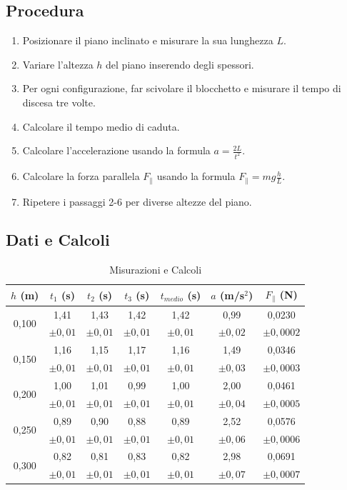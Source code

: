 \subsection{Procedura}
\begin{enumerate}
    \item Posizionare il piano inclinato e misurare la sua lunghezza $L$.
    \item Variare l'altezza $h$ del piano inserendo degli spessori.
    \item Per ogni configurazione, far scivolare il blocchetto e misurare il tempo di discesa tre volte.
    \item Calcolare il tempo medio di caduta.
    \item Calcolare l'accelerazione usando la formula $a = \frac{2L}{t^2}$.
    \item Calcolare la forza parallela $F_\parallel$ usando la formula $F_\parallel = m g \frac{h}{L}$.
    \item Ripetere i passaggi 2-6 per diverse altezze del piano.
\end{enumerate}

\subsection{Dati e Calcoli}

\begin{table}[h]
\centering
\caption{Misurazioni e Calcoli}
\begin{tabular}{ccccccc}
\toprule
$h$ (m) & $t_1$ (s) & $t_2$ (s) & $t_3$ (s) & $t_{medio}$ (s) & $a$ (m/s$^2$) & $F_\parallel$ (N) \\
\midrule
\multirow{2}{*}{0,100} & 1,41 & 1,43 & 1,42 & 1,42 & 0,99 & 0,0230 \\
& $\pm 0,01$ & $\pm 0,01$ & $\pm 0,01$ & $\pm 0,01$ & $\pm 0,02$ & $\pm 0,0002$ \\
\midrule
\multirow{2}{*}{0,150} & 1,16 & 1,15 & 1,17 & 1,16 & 1,49 & 0,0346 \\
& $\pm 0,01$ & $\pm 0,01$ & $\pm 0,01$ & $\pm 0,01$ & $\pm 0,03$ & $\pm 0,0003$ \\
\midrule
\multirow{2}{*}{0,200} & 1,00 & 1,01 & 0,99 & 1,00 & 2,00 & 0,0461 \\
& $\pm 0,01$ & $\pm 0,01$ & $\pm 0,01$ & $\pm 0,01$ & $\pm 0,04$ & $\pm 0,0005$ \\
\midrule
\multirow{2}{*}{0,250} & 0,89 & 0,90 & 0,88 & 0,89 & 2,52 & 0,0576 \\
& $\pm 0,01$ & $\pm 0,01$ & $\pm 0,01$ & $\pm 0,01$ & $\pm 0,06$ & $\pm 0,0006$ \\
\midrule
\multirow{2}{*}{0,300} & 0,82 & 0,81 & 0,83 & 0,82 & 2,98 & 0,0691 \\
& $\pm 0,01$ & $\pm 0,01$ & $\pm 0,01$ & $\pm 0,01$ & $\pm 0,07$ & $\pm 0,0007$ \\
\bottomrule
\end{tabular}
\end{table}

